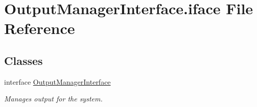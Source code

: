 \hypertarget{OutputManagerInterface_8iface}{\section{Output\-Manager\-Interface.\-iface File Reference}
\label{OutputManagerInterface_8iface}
}
\subsection*{Classes}
\begin{DoxyCompactItemize}
\item 
interface \hyperlink{interfaceOutputManagerInterface}{Output\-Manager\-Interface}
\begin{DoxyCompactList}\small\item\em Manages output for the system. \end{DoxyCompactList}\end{DoxyCompactItemize}
